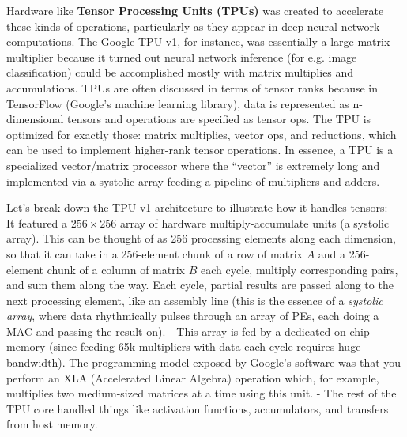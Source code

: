 Hardware like \textbf{Tensor Processing Units (TPUs)} was created to accelerate these kinds of operations, particularly as they appear in deep neural network computations. The Google TPU v1, for instance, was essentially a large matrix multiplier because it turned out neural network inference (for e.g. image classification) could be accomplished mostly with matrix multiplies and accumulations. TPUs are often discussed in terms of tensor ranks because in TensorFlow (Google’s machine learning library), data is represented as n-dimensional tensors and operations are specified as tensor ops. The TPU is optimized for exactly those: matrix multiplies, vector ops, and reductions, which can be used to implement higher-rank tensor operations. In essence, a TPU is a specialized vector/matrix processor where the “vector” is extremely long and implemented via a systolic array feeding a pipeline of multipliers and adders.

Let’s break down the TPU v1 architecture to illustrate how it handles tensors:
- It featured a $256 \times 256$ array of hardware multiply-accumulate units (a systolic array). This can be thought of as 256 processing elements along each dimension, so that it can take in a 256-element chunk of a row of matrix $A$ and a 256-element chunk of a column of matrix $B$ each cycle, multiply corresponding pairs, and sum them along the way. Each cycle, partial results are passed along to the next processing element, like an assembly line (this is the essence of a \textit{systolic array}, where data rhythmically pulses through an array of PEs, each doing a MAC and passing the result on).
- This array is fed by a dedicated on-chip memory (since feeding 65k multipliers with data each cycle requires huge bandwidth). The programming model exposed by Google’s software was that you perform an XLA (Accelerated Linear Algebra) operation which, for example, multiplies two medium-sized matrices at a time using this unit.
- The rest of the TPU core handled things like activation functions, accumulators, and transfers from host memory.

